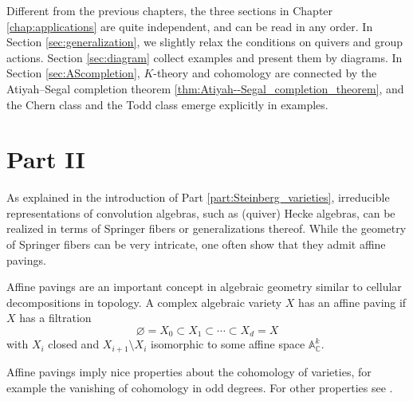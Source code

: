 Different from the previous chapters, the three sections in Chapter \ref{chap:applications} are quite independent, and can be read in any order. In Section \ref{sec:generalization}, we slightly relax the conditions on quivers and group actions. Section \ref{sec:diagram} collect examples and present them by diagrams. In Section \ref{sec:AScompletion}, $K$-theory and cohomology are connected by the Atiyah--Segal completion theorem \ref{thm:Atiyah--Segal_completion_theorem}, and the Chern class and the Todd class emerge explicitly in examples.
\clearpage
\section*{Part II}


As explained in the introduction of Part \ref{part:Steinberg_varieties}, irreducible representations of convolution algebras, such as (quiver) Hecke algebras, can be realized in terms of Springer fibers or generalizations thereof.
While the geometry of Springer fibers can be very intricate, one often show that they admit affine pavings.

Affine pavings are an important concept in algebraic geometry similar to cellular decompositions in topology. A complex algebraic variety $X$ has an affine paving if $X$ has a filtration
$$\varnothing= X_0 \subset X_1 \subset \cdots \subset X_d=X$$
with $X_i$ closed and $X_{i+1} \setminus X_i$ isomorphic to some affine space $\mathbb{A}^k_{\mathbb{C}}$.

Affine pavings imply nice properties about the cohomology of varieties, for example the vanishing of cohomology in odd degrees. For other properties see \cite[1.7]{de1988homology}.

